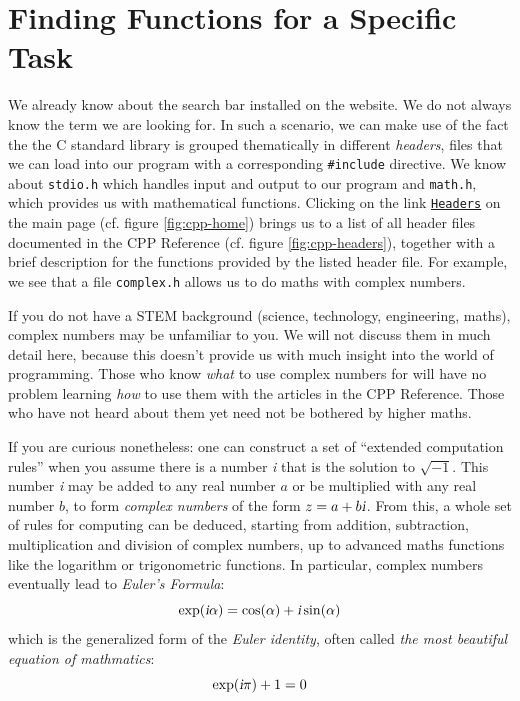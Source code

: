 \section{Finding Functions for a Specific Task}
We already know about the search bar installed on the website. We do not always know the term we are looking for. In such a scenario, we can make use of the fact the the C standard library is grouped thematically in different \emph{headers}, \ie files that we can load into our program with a corresponding \texttt{\#include} directive. We know about \texttt{stdio.h} which handles input and output to our program and \texttt{math.h}, which provides us with mathematical functions. Clicking on the link \href{https://en.cppreference.com/w/c/header}{\texttt{Headers}} on the main page (cf. figure \ref{fig:cpp-home}) brings us to a list of all header files documented in the CPP Reference (cf. figure \ref{fig:cpp-headers}), together with a brief description for the functions provided by the listed header file. For example, we see that a file \texttt{complex.h} allows us to do maths with complex numbers.

\begin{plusbox}
If you do not have a STEM background (science, technology, engineering, maths), complex numbers may be unfamiliar to you. We will not discuss them in much detail here, because this doesn't provide us with much insight into the world of programming. Those who know \emph{what} to use complex numbers for will have no problem learning \emph{how} to use them with the articles in the CPP Reference. Those who have not heard about them yet need not be bothered by higher maths.

If you are curious nonetheless: one can construct a set of \enquote{extended computation rules} when you assume there is a number \textsl{i} that is the solution to $\sqrt{-1}.$ This number \textsl{i} may be added to any real number $a$ or be multiplied with any real number $b$, to form \emph{complex numbers} of the form $z = a + b\textsl{i}$. From this, a whole set of rules for computing can be deduced, starting from addition, subtraction, multiplication and division of complex numbers, up to advanced maths functions like the logarithm or trigonometric functions. In particular, complex numbers eventually lead to \emph{Euler's Formula}:
\[ \exp(\textsl{i} \alpha) = \cos(\alpha) + \textsl{i} \sin(\alpha) \]
which is the generalized form of the \emph{Euler identity}, often called \emph{the most beautiful equation of mathmatics}:
\[ \exp(\textsl{i} \pi) + 1 = 0 \]
\end{plusbox}

